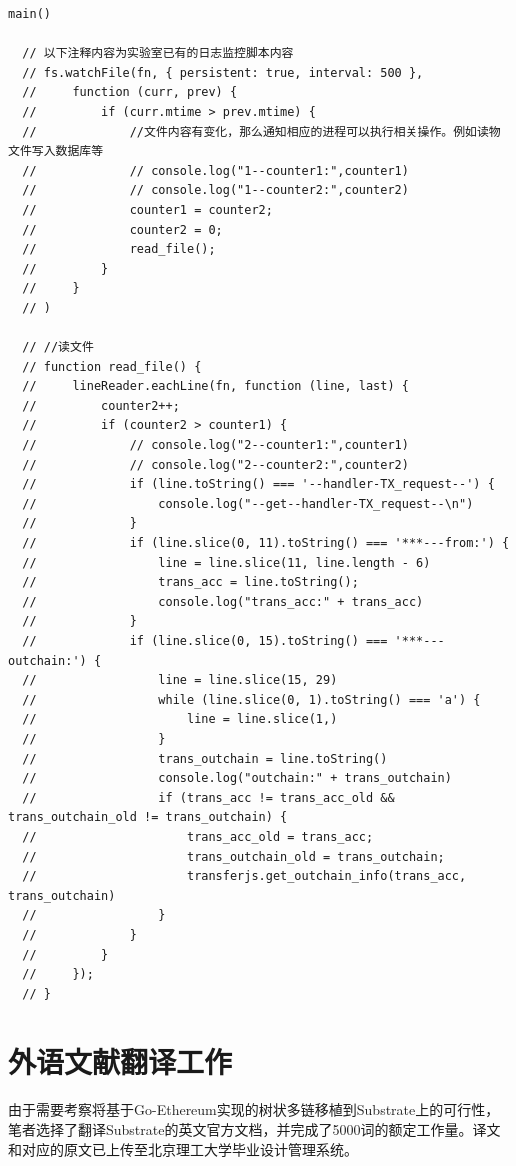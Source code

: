\begin{lstlisting}[caption={修改后的监控日志脚本}]
  main()

  // 以下注释内容为实验室已有的日志监控脚本内容
  // fs.watchFile(fn, { persistent: true, interval: 500 },
  //     function (curr, prev) {
  //         if (curr.mtime > prev.mtime) {
  //             //文件内容有变化，那么通知相应的进程可以执行相关操作。例如读物文件写入数据库等
  //             // console.log("1--counter1:",counter1)
  //             // console.log("1--counter2:",counter2)
  //             counter1 = counter2;
  //             counter2 = 0;
  //             read_file();
  //         }
  //     }
  // )

  // //读文件
  // function read_file() {
  //     lineReader.eachLine(fn, function (line, last) {
  //         counter2++;
  //         if (counter2 > counter1) {
  //             // console.log("2--counter1:",counter1)
  //             // console.log("2--counter2:",counter2)
  //             if (line.toString() === '--handler-TX_request--') {
  //                 console.log("--get--handler-TX_request--\n")
  //             }
  //             if (line.slice(0, 11).toString() === '***---from:') {
  //                 line = line.slice(11, line.length - 6)
  //                 trans_acc = line.toString();
  //                 console.log("trans_acc:" + trans_acc)
  //             }
  //             if (line.slice(0, 15).toString() === '***---outchain:') {
  //                 line = line.slice(15, 29)
  //                 while (line.slice(0, 1).toString() === 'a') {
  //                     line = line.slice(1,)
  //                 }
  //                 trans_outchain = line.toString()
  //                 console.log("outchain:" + trans_outchain)
  //                 if (trans_acc != trans_acc_old && trans_outchain_old != trans_outchain) {
  //                     trans_acc_old = trans_acc;
  //                     trans_outchain_old = trans_outchain;
  //                     transferjs.get_outchain_info(trans_acc, trans_outchain)
  //                 }
  //             }
  //         }
  //     });
  // }

\end{lstlisting}

\section{外语文献翻译工作}

由于需要考察将基于Go-Ethereum实现的树状多链移植到Substrate上的可行性，笔者选择了翻译Substrate的英文官方文档，并完成了5000词的额定工作量。译文和对应的原文已上传至北京理工大学毕业设计管理系统。

